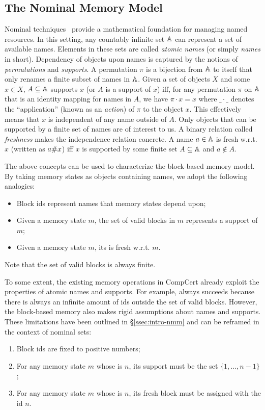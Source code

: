 \subsection{The Nominal Memory Model}
\label{ssec:nominal-nmm}

Nominal techniques~\cite{pitts-nominal,gabby2002} provide a
mathematical foundation for managing named resources. 
%
In this setting, any countably infinite set $\mathbb{A}$ can
represent a set of available names. Elements in these sets are called
\emph{atomic names} (or simply \emph{names} in short). Dependency of
objects upon names is captured by the notions of \emph{permutations}
and \emph{supports}. A permutation $\pi$ is a bijection from
$\mathbb{A}$ to itself that only renames a finite subset of names in
$\mathbb{A}$. Given a set of objects $X$ and some $x \in X$, $A
\subseteq \mathbb{A}$ supports $x$ (or $A$ is a support of $x$) iff,
for any permutation $\pi$ on $\mathbb{A}$ that is an identity mapping
for names in $A$, we have $\pi \cdot x = x$ where $\_ \cdot \_$
denotes the ``application'' (known as an \emph{action}) of $\pi$ to the
object $x$. This effectively means that $x$ is independent of any name
outside of $A$.
%
Only objects that can be supported by a finite set of names are of
interest to us.
%
A binary relation called \emph{freshness} makes the independence
relation concrete. A name $a\in \mathbb{A}$ is fresh w.r.t. $x$
(written as $a \# x$) iff $x$ is supported by some finite set $A
\subseteq \mathbb{A}$ and $a \not\in A$.

The above concepts can be used to characterize the block-based
memory model. By taking memory states as objects containing names, 
we adopt the following analogies:
%
\begin{itemize}\itemsep 0pt
\item Block ids represent names that memory states depend upon;
\item Given a memory state $m$, the set of valid blocks in $m$
  represents a support of $m$;
\item Given a memory state $m$, its \nextblock is fresh w.r.t. $m$.
\end{itemize}
%
Note that the set of valid blocks is always finite.

To some extent, the
existing memory operations in CompCert already exploit the properties
of atomic names and supports. For example,
 always succeeds because there is always an infinite amount
of ids outside the set of valid blocks.
%
However, 
the block-based memory also makes rigid assumptions
about names and supports.
These limitations have been outlined in \S\ref{ssec:intro-nmm}
and can be reframed in the context of nominal sets:
%
\begin{enumerate} \itemsep 0pt
\item Block ids are fixed to positive numbers;
\item For any memory state $m$ whose \nextblock is $n$, its support
  must be the set $\{1,\ldots,n-1\}$;
\item For any memory state $m$ whose \nextblock is $n$, its fresh
  block must be assigned with the id $n$.
\end{enumerate}

